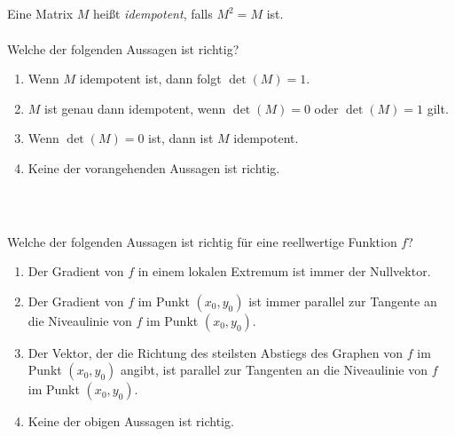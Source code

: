 \subsection*{}
Eine Matrix $ M $ heißt \textit{idempotent}, falls $ M^2 = M $ ist.\\
\\
Welche der folgenden Aussagen ist richtig?
\renewcommand{\labelenumi}{(\alph{enumi})}
\begin{enumerate}
\item 
Wenn $ M $ idempotent ist, dann folgt $ \det(M) = 1 $.
\item
$ M $ ist genau dann idempotent, wenn $ \det(M) = 0 $ oder $ \det(M) = 1 $ gilt.
\item
Wenn $ \det(M) = 0 $ ist, dann ist $ M $ idempotent.
\item
Keine der vorangehenden Aussagen ist richtig.
\end{enumerate}
\ \\
\subsection*{}
Welche der folgenden Aussagen ist richtig für eine reellwertige Funktion $ f $?
\renewcommand{\labelenumi}{(\alph{enumi})}
\begin{enumerate}
	\item 
	Der Gradient von $ f $ in einem lokalen Extremum ist immer der Nullvektor.
	\item
	Der Gradient von $ f $ im Punkt $ (x_0,y_0) $ ist immer parallel zur Tangente an die Niveaulinie von $ f $ im Punkt $ (x_0,y_0) $.
	
	\item
	Der Vektor, der die Richtung des steilsten Abstiegs des Graphen von $ f $ im Punkt $ (x_0,y_0) $ angibt, ist parallel zur Tangenten an die Niveaulinie von $ f $ im Punkt $ (x_0,y_0) $.
	\item
	Keine der obigen Aussagen ist richtig.
\end{enumerate}
\ \\
